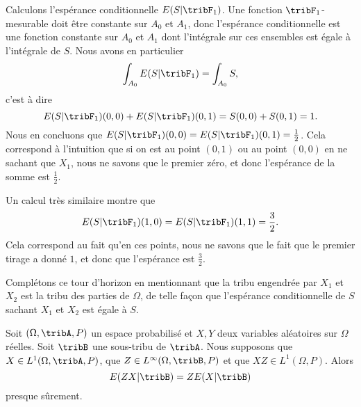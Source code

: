 \begin{example}
    Calculons l'espérance conditionnelle \( E(S|\tribF_1)\). Une fonction \( \tribF_1\)-mesurable doit être constante sur \( A_0\) et \( A_1\), donc l'espérance conditionnelle est une fonction constante sur \( A_0\) et \( A_1\) dont l'intégrale sur ces ensembles est égale à l'intégrale de \( S\). Nous avons en particulier
    \begin{equation}
        \int_{A_0}E(S|\tribF_1)=\int_{A_0}S,
    \end{equation}
    c'est à dire
    \begin{equation}
        E(S|\tribF_1)(0,0)+E(S|\tribF_1)(0,1)=S(0,0)+S(0,1)=1.
    \end{equation}
    Nous en concluons que \( E(S|\tribF_1)(0,0)=E(S|\tribF_1)(0,1)=\frac{ 1 }{2}\). Cela correspond à l'intuition que si on est au point \( (0,1)\) ou au point \( (0,0)\) en ne sachant que \( X_1\), nous ne savons que le premier zéro, et donc l'espérance de la somme est \( \frac{ 1 }{2}\).

    Un calcul très similaire montre que
    \begin{equation}
        E(S|\tribF_1)(1,0)=E(S|\tribF_1)(1,1)=\frac{ 3 }{2}.
    \end{equation}
    Cela correspond au fait qu'en ces points, nous ne savons que le fait que le premier tirage a donné \( 1\), et donc que l'espérance est \( \frac{ 3 }{2}\).

    Complétons ce tour d'horizon en mentionnant que la tribu engendrée par \( X_1\) et \( X_2\) est la tribu des parties de \( \Omega\), de telle façon que l'espérance conditionnelle de \( S\) sachant \( X_1\) et \( X_2\) est égale à \( S\).
\end{example}

\begin{proposition}   \label{PropRNBtfql}
    Soit \( (\Omega,\tribA,P)\) un espace probabilisé et \( X,Y\) deux variables aléatoires sur \( \Omega\) réelles. Soit \( \tribB\) une sous-tribu de \( \tribA\). Nous supposons que \( X\in L^1(\Omega,\tribA,P)\), que \( Z\in L^{\infty}(\Omega,\tribB,P)\) et que \( XZ\in L^1(\Omega,P)\). Alors
    \begin{equation}
        E(ZX|\tribB)=ZE(X|\tribB)
    \end{equation}
    presque sûrement.
\end{proposition}

